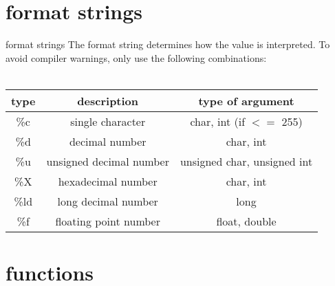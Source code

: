 \documentclass[10pt,graphics,aspectratio=169,table]{beamer}
\begin{document}
\section{format strings}
\begin{frame}{format strings}
The format string determines how the value is interpreted.
	To avoid compiler warnings, only use the following combinations: \\ \ \\
	\begin{tabular}{|c|c|c|}
		\hline
		\textbf{type} & \textbf{description} & \textbf{type of argument} \\\hline
		\%c & single character & char, int (if $<=$ 255) \\\hline
		\%d & decimal number & char, int \\\hline
		\%u & unsigned decimal number & unsigned char, unsigned int \\\hline
		\%X & hexadecimal number & char, int \\\hline
		\%ld & long decimal number & long \\\hline
		\%f & floating point number & float, double \\\hline
	\end{tabular}
\end{frame}
\section{functions}
\end{document}
